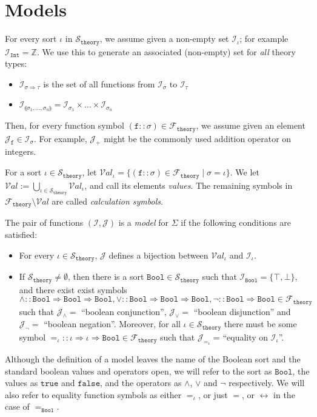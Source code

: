 \documentclass{lmcs}
\theoremstyle{theorem}\newtheorem{theorem}{Theorem}
\theoremstyle{theorem}\newtheorem{lemma}[theorem]{Lemma}
\theoremstyle{theorem}\newtheorem{corollary}[theorem]{Corollary}
\theoremstyle{definition}\newtheorem{definition}[theorem]{Definition}
\theoremstyle{definition}\newtheorem{example}[theorem]{Example}
\newcommand{\thF}{\mathcal{F}_{\mathtt{theory}}}
\newcommand{\thSorts}{\mathcal{S}_{\mathtt{theory}}}
\newcommand{\I}{\mathcal{I}}
\newcommand{\J}{\mathcal{J}}
\newcommand{\Val}{\mathcal{V}\!\mathit{al}}
\newcommand{\asort}{\iota}
\newcommand{\atype}{\sigma}
\newcommand{\btype}{\tau}
\newcommand{\identifier}[1]{\mathtt{#1}}
\newcommand{\afun}{\identifier{f}}
\newcommand{\product}[2]{\llparenthesis #1,\dots,#2 \rrparenthesis}
\newcommand{\arrtype}{\Rightarrow}
\newcommand{\symb}[1]{\mathtt{#1}}
\newcommand{\strue}{\symb{true}}
\newcommand{\sfalse}{\symb{false}}
\newcommand{\bool}{\symb{Bool}}
\newcommand{\tint}{\symb{Int}}
\begin{document}
\section{Models}\label{sec:models}

For every sort $\asort$ in $\thSorts$, we assume given a non-empty set
$\I_\asort$; for example $\I_{\tint} = \mathbb{Z}$.  We use this to generate an
associated (non-empty) set for \emph{all} theory types:
\begin{itemize}
\item $\I_{\atype \arrtype \btype}$ is the set of all functions from
  $\I_\atype$ to $\I_\btype$
\item $\I_{\product{\atype_1}{\atype_n}} = \I_{\atype_1} \times \dots \times
  \I_{\atype_n}$
\end{itemize}
Then, for every function symbol $(\afun :: \atype) \in \thF$, we assume given
an element $\J_\afun \in \I_\atype$.  For example, $\J_+$ might be the
commonly used addition operator on integers.

For a sort $\asort \in \thSorts$, let $\Val_\asort = \{ (\afun :: \atype) \in
\thF \mid \atype = \asort \}$.
We let $\Val := \bigcup_{\asort \in \thSorts} \Val_\asort$, and call its
elements \emph{values}.
The remaining symbols in $\thF \setminus \Val$ are called \emph{calculation
symbols}.

The pair of functions $(\I,\J)$ is a \emph{model} for $\Sigma$ if the following
conditions are satisfied:
\begin{itemize}
\item For every $\asort \in \thSorts$, $\J$ defines a bijection between
  $\Val_\asort$ and $\I_\asort$.
\item If $\thSorts \neq \emptyset$, then there is a sort $\bool \in \thSorts$
  such that $\I_\bool = \{\top,\bot\}$, and there exist exist symbols
  $\wedge :: \bool \arrtype \bool \arrtype \bool,\vee :: \bool \arrtype \bool
  \arrtype \bool,\neg :: \bool \arrtype \bool \in \thF$ such that
  $\J_\wedge =$ ``boolean conjunction'', $\J_\vee =$ ``boolean disjunction'' and
  $\J_\neg =$ ``boolean negation''.
  Moreover, for all $\asort \in \thSorts$ there must be some symbol $=_\asort
  :: \asort \arrtype \asort \arrtype \bool \in \thF$ such that
  $\J_{=_\asort}$ = ``equality on $\I_\asort$''.
\end{itemize}

Although the definition of a model leaves the name of the Boolean sort and the
standard boolean values and operators open, we will refer to the sort as
$\bool$, the values as $\strue$ and $\sfalse$, and the operators as $\wedge$,
$\vee$ and $\neg$ respectively.  We will also refer to equality function
symbols as either $=_\asort$, or just $=$, or $\leftrightarrow$ in the case of
$=_\bool$.
\end{document}
